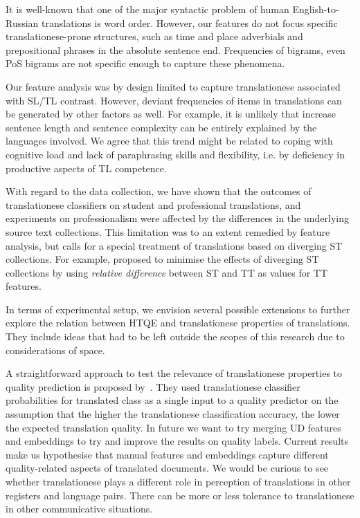 It is well-known that one of the major syntactic problem of human English-to-Russian translations is word order. However, our features do not focus specific translationese-prone structures, such as time and place adverbials and prepositional phrases in the absolute sentence end. Frequencies of bigrams, even PoS bigrams are not specific enough to capture these phenomena.

Our feature analysis was by design limited to capture translationese associated with SL/TL contrast.
However, deviant frequencies of items in translations can be generated by other factors as well. For example, it is unlikely that increase sentence length and sentence complexity can be entirely explained by the languages involved. We agree that this trend might be related to coping with cognitive load and lack of paraphrasing skills and flexibility, i.e. by deficiency in productive aspects of TL competence.

With regard to the data collection, we have shown that the outcomes of translationese classifiers on student and professional translations, and experiments on professionalism were affected by the differences in the underlying source text collections. This limitation was to an extent remedied by feature analysis, but calls for a special treatment of translations based on diverging ST collections. For example, \citet{Popovic2020} proposed to minimise the effects of diverging ST collections by using \textit{relative difference} between ST and TT as values for TT features.

In terms of experimental setup, we envision several possible extensions to further explore the relation between HTQE and translationese properties of translations. They include ideas that had to be left outside the scopes of this research due to considerations of space. 

A straightforward approach to test the relevance of translationese properties to quality prediction is proposed  by~\citet{Aharoni2015}. They used translationese classifier probabilities for translated class as a single input to a quality predictor on the assumption that the higher the translationese classification accuracy, the lower the expected translation quality.
In future we want to try merging UD features and embeddings to try and improve the results on quality labels. Current results make us hypothesise that manual features and embeddings capture different quality-related aspects of translated documents. We would be curious to see whether translationese plays a different role in perception of translations in other registers and language pairs. There can be more or less tolerance to translationese in other communicative situations. 

